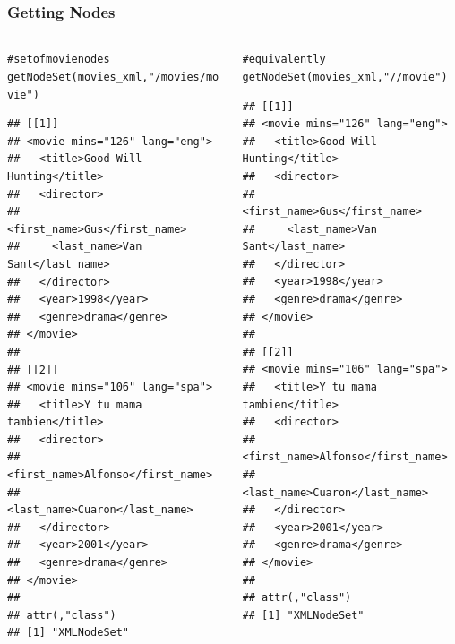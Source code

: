 \documentclass{beamer}\usepackage[]{graphicx}\usepackage[]{color}
\makeatletter
\newcommand{\hlstr}[1]{\textcolor[rgb]{0.063,0.58,0.627}{#1}}%
\newcommand{\hlcom}[1]{\textcolor[rgb]{0.588,0.588,0.588}{#1}}%
\newcommand{\hlstd}[1]{\textcolor[rgb]{0.196,0.196,0.196}{#1}}%
\newcommand{\hlkwd}[1]{\textcolor[rgb]{0.78,0.227,0.412}{#1}}%
\newenvironment{kframe}{%
 \def\at@end@of@kframe{}%
 \ifinner\ifhmode%
  \def\at@end@of@kframe{\end{minipage}}%
  \begin{minipage}{\columnwidth}%
 \fi\fi%
 \def\FrameCommand##1{\hskip\@totalleftmargin \hskip-\fboxsep
 \colorbox{shadecolor}{##1}\hskip-\fboxsep
     \hskip-\linewidth \hskip-\@totalleftmargin \hskip\columnwidth}%
 \MakeFramed {\advance\hsize-\width
   \@totalleftmargin\z@ \linewidth\hsize
   \@setminipage}}%
 {\par\unskip\endMakeFramed%
 \at@end@of@kframe}
\newenvironment{knitrout}{}{} %
\makeatother
\begin{document}

\begin{frame}[fragile]
\frametitle{Getting Nodes}

\begin{columns}[t]
\begin{column}{0.5\textwidth}
\begin{knitrout}\tiny
{}\color{fgcolor}\begin{kframe}
\begin{alltt}
\hlcom{# set of movie nodes}
\hlkwd{getNodeSet}\hlstd{(movies_xml,} \hlstr{"/movies/movie"}\hlstd{)}
\end{alltt}
\begin{verbatim}
## [[1]]
## <movie mins="126" lang="eng">
##   <title>Good Will Hunting</title>
##   <director>
##     <first_name>Gus</first_name>
##     <last_name>Van Sant</last_name>
##   </director>
##   <year>1998</year>
##   <genre>drama</genre>
## </movie> 
## 
## [[2]]
## <movie mins="106" lang="spa">
##   <title>Y tu mama tambien</title>
##   <director>
##     <first_name>Alfonso</first_name>
##     <last_name>Cuaron</last_name>
##   </director>
##   <year>2001</year>
##   <genre>drama</genre>
## </movie> 
## 
## attr(,"class")
## [1] "XMLNodeSet"
\end{verbatim}
\end{kframe}
\end{knitrout}
\end{column}

\begin{column}{0.5\textwidth}
\begin{knitrout}\tiny
{}\color{fgcolor}\begin{kframe}
\begin{alltt}
\hlcom{# equivalently}
\hlkwd{getNodeSet}\hlstd{(movies_xml,} \hlstr{"//movie"}\hlstd{)}
\end{alltt}
\begin{verbatim}
## [[1]]
## <movie mins="126" lang="eng">
##   <title>Good Will Hunting</title>
##   <director>
##     <first_name>Gus</first_name>
##     <last_name>Van Sant</last_name>
##   </director>
##   <year>1998</year>
##   <genre>drama</genre>
## </movie> 
## 
## [[2]]
## <movie mins="106" lang="spa">
##   <title>Y tu mama tambien</title>
##   <director>
##     <first_name>Alfonso</first_name>
##     <last_name>Cuaron</last_name>
##   </director>
##   <year>2001</year>
##   <genre>drama</genre>
## </movie> 
## 
## attr(,"class")
## [1] "XMLNodeSet"
\end{verbatim}
\end{kframe}
\end{knitrout}
\end{column}
\end{columns}

\end{frame}
\end{document}
